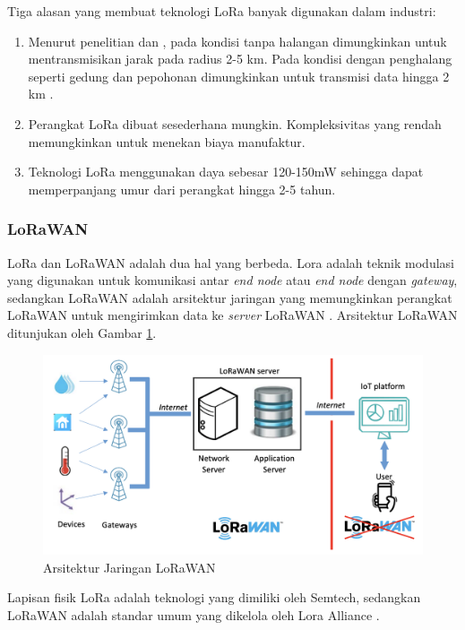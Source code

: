 Tiga alasan yang membuat teknologi LoRa banyak digunakan dalam industri:

\begin{enumerate}
	\item Menurut penelitian \cite{Petajajarvi2016} dan \cite{Haxhibeqiri2017}, pada kondisi tanpa halangan dimungkinkan untuk mentransmisikan jarak pada radius 2-5 km. Pada kondisi dengan penghalang seperti gedung dan pepohonan dimungkinkan untuk transmisi data hingga 2 km \cite{Rida2019}.
	\item Perangkat LoRa dibuat sesederhana mungkin. Kompleksivitas yang rendah memungkinkan untuk menekan biaya manufaktur.
	\item Teknologi LoRa menggunakan daya sebesar 120-150mW sehingga dapat memperpanjang umur dari perangkat hingga 2-5 tahun.
\end{enumerate}

\subsubsection{LoRaWAN}
LoRa dan LoRaWAN adalah dua hal yang berbeda. Lora adalah teknik modulasi yang digunakan untuk komunikasi antar \textit{end node} atau \textit{end node} dengan \textit{gateway}, sedangkan LoRaWAN adalah arsitektur jaringan yang memungkinkan perangkat LoRaWAN untuk mengirimkan data ke \textit{server} LoRaWAN \cite{Zhou2019}. Arsitektur LoRaWAN ditunjukan oleh Gambar \ref{Fig: lorawan-architecure}.
\begin{figure}[ht]
	\centering
	\includegraphics[width=13cm]{contents/chapter-2/lorawan-architecture.png}
	\caption{Arsitektur Jaringan LoRaWAN \cite{Montagny2022}}
	\label{Fig: lorawan-architecure}
\end{figure}

Lapisan fisik LoRa adalah teknologi yang dimiliki oleh Semtech, sedangkan LoRaWAN adalah standar umum yang dikelola oleh Lora Alliance \cite{Augustin2016}. 

